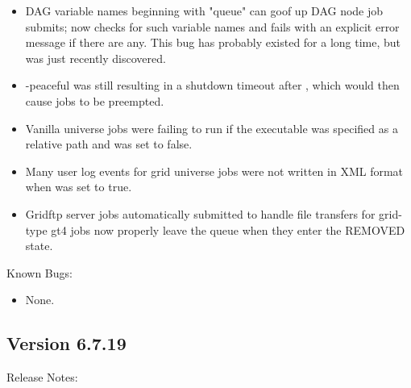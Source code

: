 \begin{itemize}
\item DAG variable names beginning with "queue" can goof up DAG node
job submits;  now checks for such variable names and
fails with an explicit error message if there are any.  This bug has
probably existed for a long time, but was just recently discovered.

\item {} -peaceful was still resulting in a shutdown timeout
after , which would then cause jobs
to be preempted.

\item Vanilla universe jobs were failing to run if the executable was specified
as a relative path and  was set to false.

\item Many user log events for grid universe jobs were not written in XML
format when  was set to true.

\item Gridftp server jobs automatically submitted to handle file transfers
for grid-type gt4 jobs now properly leave the queue when they enter the
REMOVED state.

\end{itemize}

\noindent Known Bugs:

\begin{itemize}

\item None.

\end{itemize}




\subsection*{\label{sec:New-6-7-19}Version 6.7.19}

\noindent Release Notes:

